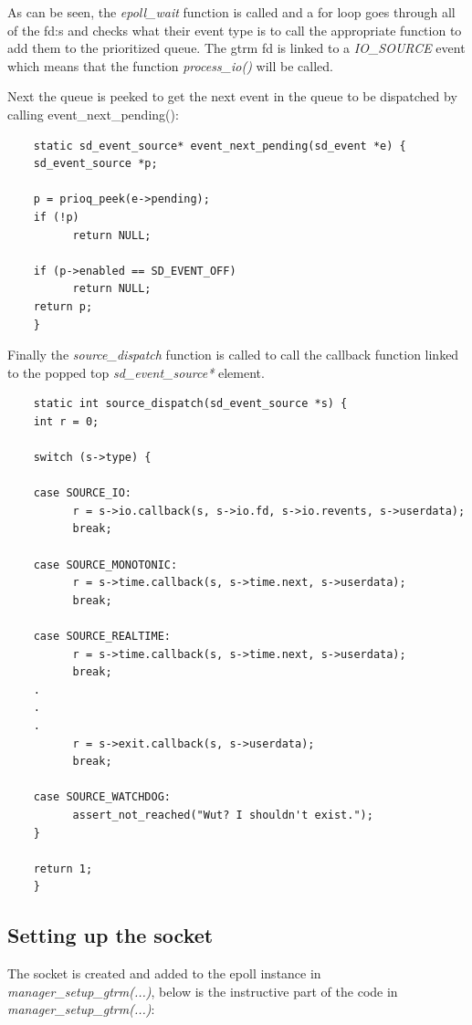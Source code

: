 \documentclass[nobiblatex]{LTHthesis}
\begin{document}
As can be seen, the \emph{epoll\_wait} function is called and a for loop goes through all of the fd:s and checks what their event type is to call the appropriate function to add them to the prioritized queue.
The gtrm fd is linked to a \emph{IO\_SOURCE} event which means that the function \emph{process\_io()} will be called.

Next the queue is peeked to get the next event in the queue to be dispatched by calling event\_next\_pending():
\begin{verbatim}
	static sd_event_source* event_next_pending(sd_event *e) {
	sd_event_source *p;

	p = prioq_peek(e->pending);
	if (!p)
		  return NULL;

	if (p->enabled == SD_EVENT_OFF)
		  return NULL;
	return p;
	}
\end{verbatim}

Finally the \emph{source\_dispatch} function is called to call the callback function linked to the popped top \emph{sd\_event\_source*} element.

\begin{verbatim}
	static int source_dispatch(sd_event_source *s) {
	int r = 0;

	switch (s->type) {

	case SOURCE_IO:
		  r = s->io.callback(s, s->io.fd, s->io.revents, s->userdata);
		  break;

	case SOURCE_MONOTONIC:
		  r = s->time.callback(s, s->time.next, s->userdata);
		  break;

	case SOURCE_REALTIME:
		  r = s->time.callback(s, s->time.next, s->userdata);
		  break;
	.
	.
	.
		  r = s->exit.callback(s, s->userdata);
		  break;

	case SOURCE_WATCHDOG:
		  assert_not_reached("Wut? I shouldn't exist.");
	}
	
	return 1;
	}
\end{verbatim}  

\subsection{Setting up the socket}

The socket is created and added to the epoll instance in \emph{manager\_setup\_gtrm(...)}, below is the instructive part of the code in \emph{manager\_setup\_gtrm(...)}:
\end{document}
